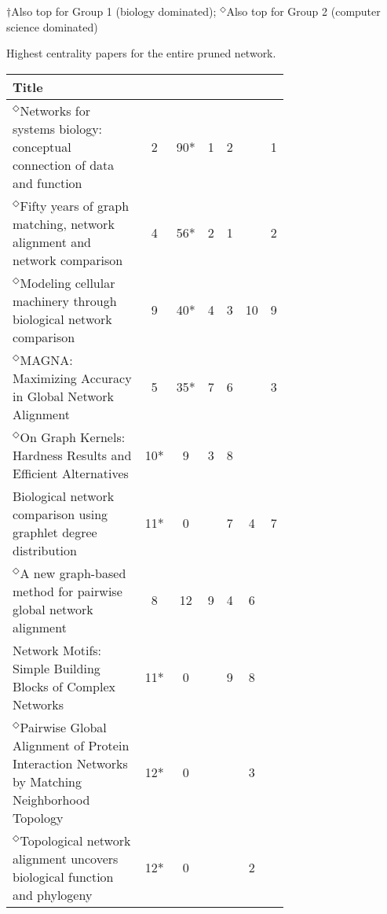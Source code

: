 \documentclass[12pt]{thesis}
\theoremstyle{plain}
\theoremstyle{definition}
\theoremstyle{remark}
\begin{document}
\begin{table}[H]
{\vspace{-.03cm}
$\dagger$Also top for Group 1 (biology dominated); $^\Diamond$Also top for Group 2 (computer science dominated)
}
\vspace{-.25cm}
\caption{Highest centrality papers for the entire pruned network.}
\label{tab:toppapers_all}
\end{table}

\begin{table}[H]
{\fontsize{10}{13}\selectfont
\begin{tabular}{|L{0.7\linewidth}|c|c|c|c|c|c|}
\hline
Title &  &   &  &   &   &  \\ \hline\hline
$^\Diamond$Networks for systems biology: conceptual connection of data and function  \cite{Emmert_Streib_2011} & 2 & 90* & 1 & 2 &  & 1 \\ \hline
$^\Diamond$Fifty years of graph matching, network alignment and network comparison  \cite{Emmert_Streib_2016} & 4 & 56* & 2 & 1 &  & 2 \\ \hline
$^\Diamond$Modeling cellular machinery through biological network comparison  \cite{Sharan_2006} & 9 & 40* & 4 & 3 & 10 & 9 \\ \hline
$^\Diamond$MAGNA: Maximizing Accuracy in Global Network Alignment  \cite{Saraph_2014} & 5 & 35* & 7 & 6 &  & 3 \\ \hline
$^\Diamond$On Graph Kernels: Hardness Results and Efficient Alternatives  \cite{Gartner_2003} & 10* & 9 & 3 & 8 &  &  \\ \hline
Biological network comparison using graphlet degree distribution  \cite{Przulj_2007} & 11* & 0 &  & 7 & 4 & 7 \\ \hline
$^\Diamond$A new graph-based method for pairwise global network alignment  \cite{Klau_2009} & 8 & 12 & 9 & 4 & 6 &  \\ \hline
Network Motifs: Simple Building Blocks of Complex Networks  \cite{Milo_2002} & 11* & 0 &  & 9 & 8 &  \\ \hline
$^\Diamond$Pairwise Global Alignment of Protein Interaction Networks by Matching Neighborhood Topology  \cite{Singh_2007} & 12* & 0 &  &  & 3 &  \\ \hline
$^\Diamond$Topological network alignment uncovers biological function and phylogeny  \cite{Kuchaiev_2010} & 12* & 0 &  &  & 2 &  \\ \hline

\end{tabular}}
\end{table}
\end{document}
